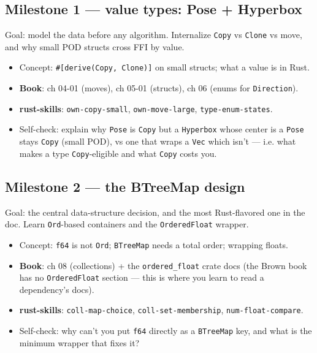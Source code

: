 \documentclass[11pt]{article}
\begin{document}
\subsection{Milestone 1 — value types: Pose + Hyperbox}
\label{sec:org516a1f0}

Goal: model the data before any algorithm. Internalize \texttt{Copy} vs \texttt{Clone} vs
move, and why small POD structs cross FFI by value.

\begin{itemize}
\item Concept: \texttt{\#[derive(Copy, Clone)]} on small structs; what a value is in Rust.
\item \textbf{\textbf{Book}}: ch 04-01 (moves), ch 05-01 (structs), ch 06 (enums for \texttt{Direction}).
\item \textbf{\textbf{rust-skills}}: \texttt{own-copy-small}, \texttt{own-move-large}, \texttt{type-enum-states}.
\item Self-check: explain why \texttt{Pose} is \texttt{Copy} but a \texttt{Hyperbox} whose center is a
\texttt{Pose} stays \texttt{Copy} (small POD), vs one that wraps a \texttt{Vec} which isn't — i.e.
what makes a type \texttt{Copy}-eligible and what \texttt{Copy} costs you.
\end{itemize}
\subsection{Milestone 2 — the BTreeMap design}
\label{sec:org3fe326b}

Goal: the central data-structure decision, and the most Rust-flavored one in
the doc. Learn \texttt{Ord}-based containers and the \texttt{OrderedFloat} wrapper.

\begin{itemize}
\item Concept: \texttt{f64} is not \texttt{Ord}; \texttt{BTreeMap} needs a total order; wrapping floats.
\item \textbf{\textbf{Book}}: ch 08 (collections) + the \texttt{ordered\_float} crate docs (the Brown
book has no \texttt{OrderedFloat} section — this is where you learn to read a
dependency's docs).
\item \textbf{\textbf{rust-skills}}: \texttt{coll-map-choice}, \texttt{coll-set-membership}, \texttt{num-float-compare}.
\item Self-check: why can't you put \texttt{f64} directly as a \texttt{BTreeMap} key, and what is
the minimum wrapper that fixes it?
\end{itemize}
\end{document}
